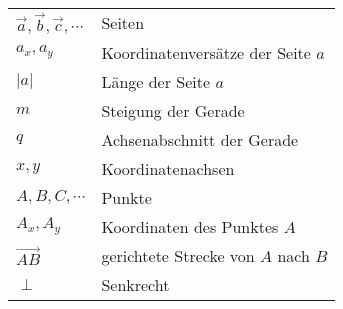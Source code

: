 \documentclass[a4paper]{amsart}
\theoremstyle{definition}
\begin{document}
\begin{tabular}{ll}
    $\vec a,\vec b, \vec c, \cdots$               &Seiten\\
    $a_x,a_y$                   &Koordinatenversätze der Seite $a$\\
    $|a|$                       &Länge der Seite $a$\\
    $m$                         &Steigung der Gerade\\
    $q$                         &Achsenabschnitt der Gerade\\
    $x, y$                      &Koordinatenachsen\\
    $A, B, C, \cdots$          &Punkte\\
    $A_x, A_y$                 &Koordinaten des Punktes $A$\\
    $\overrightarrow{AB}$      &gerichtete Strecke von $A$ nach $B$\\
    $\perp$                    &Senkrecht
\end{tabular}
\end{document}
